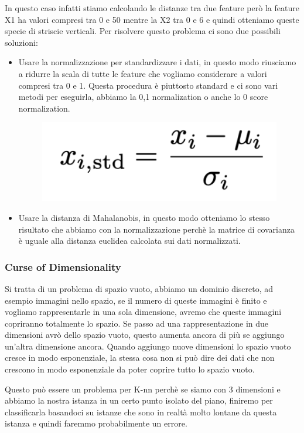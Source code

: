 \documentclass[14pt]{extreport}
\begin{document}
In questo caso infatti stiamo calcolando le distanze tra due feature però la feature X1 ha valori compresi tra 0 e 50 mentre la X2 tra 0 e 6 e quindi
otteniamo queste specie di striscie verticali. Per risolvere questo problema ci sono due possibili soluzioni:

\begin{itemize}
	\item Usare la normalizzazione per standardizzare i dati, in questo modo riusciamo a ridurre la scala di tutte le feature che vogliamo considerare
	a valori compresi tra 0 e 1. Questa procedura è piuttosto standard e ci sono vari metodi per eseguirla, abbiamo la 0,1 normalization o anche lo 0
	score normalization.

	      \begin{figure}[H]
		      \centering
		      \includegraphics[width=0.7\linewidth]{473.jpeg}
	      \end{figure}
	\item Usare la distanza di Mahalanobis, in questo modo otteniamo lo stesso risultato che abbiamo con la normalizzazione perchè la matrice di
	covarianza è uguale alla distanza euclidea calcolata sui dati normalizzati.

\end{itemize}

\subsubsection{Curse of Dimensionality}

Si tratta di un problema di spazio vuoto, abbiamo un dominio discreto, ad esempio immagini nello spazio, se il numero di queste immagini è finito e
vogliamo rappresentarle in una sola dimensione, avremo che queste immagini copriranno totalmente lo spazio. Se passo ad una rappresentazione in due
dimensioni avrò dello spazio vuoto, questo aumenta ancora di più se aggiungo un’altra dimensione ancora. Quando aggiungo nuove dimensioni lo spazio
vuoto cresce in modo esponenziale, la stessa cosa non si può dire dei dati che non crescono in modo esponenziale da poter coprire tutto lo spazio
vuoto.

Questo può essere un problema per K-nn perchè se siamo con 3 dimensioni e abbiamo la nostra istanza in un certo punto isolato del piano, finiremo per
classificarla basandoci su istanze che sono in realtà molto lontane da questa istanza e quindi faremmo probabilmente un errore.
\end{document}
